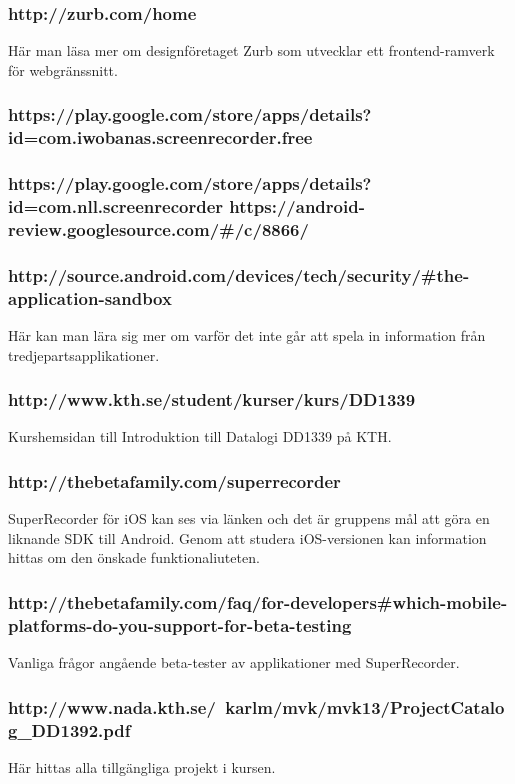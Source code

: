 \subsubsection{http://zurb.com/home}
Här man läsa mer om designföretaget Zurb som utvecklar ett frontend-ramverk för webgränssnitt.

\subsubsection{https://play.google.com/store/apps/details?id=com.iwobanas.screenrecorder.free}

\subsubsection{https://play.google.com/store/apps/details?id=com.nll.screenrecorder
https://android-review.googlesource.com/#/c/8866/}

\subsubsection{http://source.android.com/devices/tech/security/#the-application-sandbox}
Här kan man lära sig mer om varför det inte går att spela in information från tredjepartsapplikationer.

\subsubsection{http://www.kth.se/student/kurser/kurs/DD1339}
Kurshemsidan till Introduktion till Datalogi DD1339 på KTH.

\subsubsection{http://thebetafamily.com/superrecorder}
SuperRecorder för iOS kan ses via länken och det är gruppens mål att göra en liknande SDK till Android. Genom att studera iOS-versionen kan information hittas om den önskade funktionaliuteten.

\subsubsection{http://thebetafamily.com/faq/for-developers#which-mobile-platforms-do-you-support-for-beta-testing}
Vanliga frågor angående beta-tester av applikationer med SuperRecorder.

\subsubsection{http://www.nada.kth.se/~karlm/mvk/mvk13/ProjectCatalog_DD1392.pdf}
Här hittas alla tillgängliga projekt i kursen.

